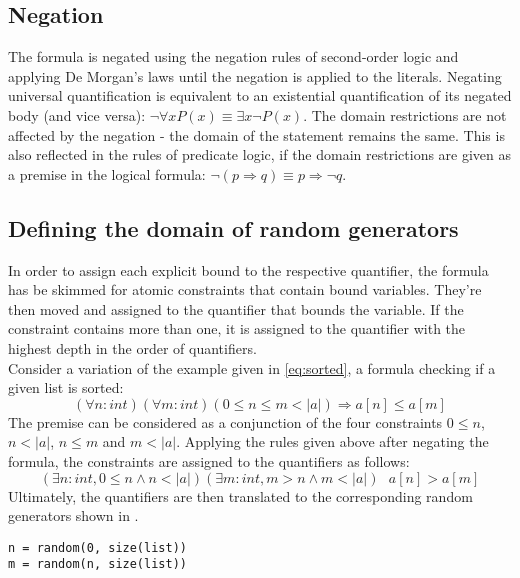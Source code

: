 \subsection{Negation}
The formula is negated using the negation rules of second-order logic and applying De Morgan's laws until the negation is applied to the literals. Negating universal quantification is equivalent to an existential quantification of its negated body (and vice versa): $\neg \forall x P(x) \equiv \exists x \neg P(x)$. The domain restrictions are not affected by the negation - the domain of the statement remains the same. This is also reflected in the rules of predicate logic, if the domain restrictions are given as a premise in the logical formula: $\neg (p \Rightarrow q) \equiv p \Rightarrow \neg q $.


\subsection{Defining the domain of random generators}
In order to assign each explicit bound to the respective quantifier, the formula has be skimmed for atomic constraints that contain bound variables. They're then moved and assigned to the quantifier that bounds the variable. If the constraint contains more than one, it is assigned to the quantifier with the highest depth in the order of quantifiers. \\
Consider a variation of the example given in \eqref{eq:sorted}, a formula checking if a given list is sorted:
\begin{equation}\label{eq:sorted_v2}
	(\forall n : int)(\forall m : int) (0 \leq n \le m < |a|) \Rightarrow a[n] \leq a[m]
\end{equation}
The premise can be considered as a conjunction of the four constraints $0 \leq n$, $n < |a| $, $n \le m$ and $m < |a|$. Applying the rules given above after negating the formula, the constraints are assigned to the quantifiers as follows:
\begin{equation}\label{eq:sorted_v2_bounds}
	(\exists n : int, 0 \leq n \wedge n < |a|)(\exists m : int, m > n \wedge m < |a|) \text{ } a[n] > a[m]
\end{equation}
Ultimately, the quantifiers are then translated to the corresponding random generators shown in .
\begin{lstlisting}[label=lst:rand]
n = random(0, size(list))
m = random(n, size(list))
\end{lstlisting}

